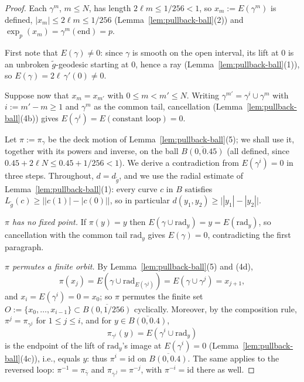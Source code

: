 \begin{proof}
Each $\gamma^m$, $m\le N$, has length $2\ell m\le1/256<1$, so
$x_m:=E(\gamma^m)$ is defined, $|x_m|\le2\ell m\le1/256$
(Lemma~\ref{lem:pullback-ball}(2)) and
$\exp_p(x_m)=\gamma^m(\text{end})=p$.

First note that $E(\gamma)\not=0$: since $\gamma$ is smooth on the
open interval, its lift at $0$ is an unbroken $\tilde g$-geodesic
starting at $0$, hence a ray
(Lemma~\ref{lem:pullback-ball}(1)), so
$E(\gamma)=2\ell\,\gamma'(0)\not=0$.

Suppose now that $x_m=x_{m'}$ with $0\le m<m'\le N$. Writing
$\gamma^{m'}=\gamma^{i}\cup\gamma^{m}$ with $i:=m'-m\ge 1$ and
$\gamma^m$ as the common tail, cancellation
(Lemma~\ref{lem:pullback-ball}(4b)) gives $E(\gamma^i)=E(\text{constant
loop})=0$.

Let $\pi:=\pi_\gamma$ be the deck motion of
Lemma~\ref{lem:pullback-ball}(5); we shall use it, together with
its powers and inverse, on the ball $\overline{B(0,0.45)}$ (all
defined, since $0.45+2\ell N\le0.45+1/256<1$). We derive a
contradiction from $E(\gamma^i)=0$ in three steps. Throughout,
$d=d_{\tilde g}$, and we use the radial estimate of
Lemma~\ref{lem:pullback-ball}(1): every curve $c$ in $B$ satisfies
$L_{\tilde g}(c)\ge\bigl||c(1)|-|c(0)|\bigr|$, so in particular
$d(y_1,y_2)\ge\bigl||y_1|-|y_2|\bigr|$.

\emph{$\pi$ has no fixed point.} If $\pi(y)=y$ then
$E(\gamma\cup\mathrm{rad}_y)=y=E(\mathrm{rad}_y)$, so cancellation
with the common tail $\mathrm{rad}_y$ gives $E(\gamma)=0$,
contradicting the first paragraph.

\emph{$\pi$ permutes a finite orbit.} By
Lemma~\ref{lem:pullback-ball}(5) and (4d),
$$\pi(x_j)=E\left(\gamma\cup\mathrm{rad}_{E(\gamma^j)}\right)
=E\left(\gamma\cup\gamma^j\right)=x_{j+1},$$
and $x_i=E(\gamma^i)=0=x_0$; so $\pi$ permutes the finite set
$O:=\{x_0,\ldots,x_{i-1}\}\subset\overline{B(0,1/256)}$
cyclically. Moreover, by the composition rule,
$\pi^{j}=\pi_{\gamma^{j}}$ for $1\le j\le i$, and for
$y\in\overline{B(0,0.4)}$,
$$\pi_{\gamma^i}(y)=E\left(\gamma^i\cup\mathrm{rad}_y\right)$$
is the endpoint of the lift of $\mathrm{rad}_y$'s image at
$E(\gamma^i)=0$ (Lemma~\ref{lem:pullback-ball}(4c)), i.e., equals
$y$: thus $\pi^i=\mathrm{id}$ on $\overline{B(0,0.4)}$. The same
applies to the reversed loop: $\pi^{-1}=\pi_{\bar\gamma}$ and
$\pi_{\bar\gamma^{\,j}}=\pi^{-j}$, with
$\pi^{-i}=\mathrm{id}$ there as well.


\end{proof}
